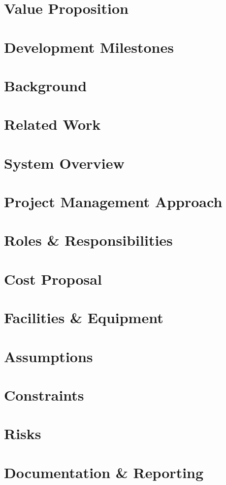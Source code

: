 \documentclass[11pt,letterpaper]{article}
\begin{document}
\section{Value Proposition}

\section{Development Milestones}

\newpage

\section{Background}

\section{Related Work}

\section{System Overview}

\section{Project Management Approach}

\section{Roles \& Responsibilities}

\section{Cost Proposal}

\section{Facilities \& Equipment}

\section{Assumptions}

\section{Constraints}

\section{Risks}

\section{Documentation \& Reporting}

\newpage


{}
\end{document}
